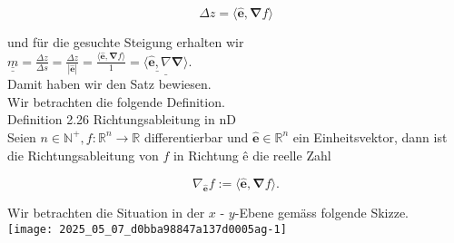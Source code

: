 \documentclass[10pt]{article}
\begin{document}
\begin{equation*}
\Delta z=\langle\hat{\mathbf{e}}, \boldsymbol{\nabla} f\rangle \tag{2.196}
\end{equation*}


und für die gesuchte Steigung erhalten wir\\
$\underline{\underline{m}}=\frac{\Delta z}{\Delta s}=\frac{\Delta z}{|\hat{\mathbf{e}}|}=\frac{\langle\hat{\mathbf{e}}, \boldsymbol{\nabla} f\rangle}{1}=\underline{\underline{\langle\hat{\mathbf{e}}, \nabla} \boldsymbol{\nabla}\rangle}$.\\
Damit haben wir den Satz bewiesen.\\
Wir betrachten die folgende Definition.\\
Definition 2.26 Richtungsableitung in nD\\
Seien $n \in \mathbb{N}^{+}, f: \mathbb{R}^{n} \rightarrow \mathbb{R}$ differentierbar und $\hat{\mathbf{e}} \in \mathbb{R}^{n}$ ein Einheitsvektor, dann ist die Richtungsableitung von $f$ in Richtung ê die reelle Zahl


\begin{equation*}
\nabla_{\hat{\mathbf{e}}} f:=\langle\hat{\mathbf{e}}, \boldsymbol{\nabla} f\rangle . \tag{2.198}
\end{equation*}


Wir betrachten die Situation in der $x$ - $y$-Ebene gemäss folgende Skizze.\\
\texttt{[image: 2025\_05\_07\_d0bba98847a137d0005ag-1]}
\end{document}
